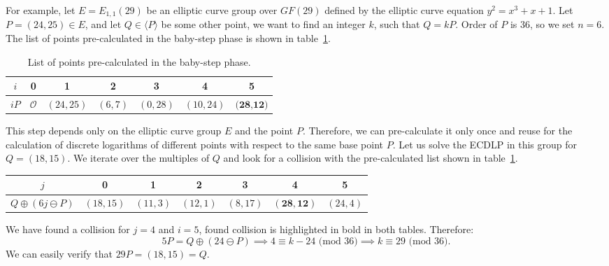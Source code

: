 \documentclass[thesis=M,english]{FITthesis}[2012/10/20]
\theoremstyle{remark}
\theoremstyle{definition}
\begin{document}
\noindent For example, let $E = E_{1,1}(29)$ be an elliptic curve group over $GF(29)$ defined by the elliptic curve equation $y^2 = x^3 + x + 1$. Let $P = (24,25) \in E$, and let $Q \in \langle P \rangle$ be some other point, we want to find an integer $k$, such that $Q = kP.$ Order of $P$ is 36, so we set $n = 6$. The list of points pre-calculated in the baby-step phase is shown in table~\ref{baby}.
\begin{table}[h]
\centering
\begin{tabular}{ |c||c|c|c|c|c|c| }
\hline
$i$ & 0 & 1 & 2 & 3 & 4 & 5\\ \hline
 $iP$ & $\mathcal{O}$ & $(24,25)$ &  $(6,7)$ & $(0,28)$ & $(10,24)$ & $\textbf{(28,12)}$ \\ \hline
\end{tabular}
\caption[List of points pre-calculated in the baby-step phase]{List of points pre-calculated in the baby-step phase.}
\label{baby}
\end{table}
This step depends only on the elliptic curve group $E$ and the point $P$. Therefore, we can pre-calculate it only once and reuse for the calculation of discrete logarithms of different points with respect to the same base point $P$. Let us solve the ECDLP in this group for $Q = (18,15)$. We iterate over the multiples of $Q$ and look for a collision with the pre-calculated list shown in table~\ref{baby}.
\begin{center}
\begin{tabular}{ |c||c|c|c|c|c|c| }
\hline
$j$ & 0 & 1 & 2 & 3 & 4 & 5\\ \hline
 $Q\oplus(6j\ominus P)$ & $(18,15)$ & $(11,3)$ &  $(12,1)$ & $(8,17)$ & $\mathbf{(28,12)}$ & $(24,4)$ \\ \hline
\end{tabular}
\end{center}
We have found a collision for $j=4$ and $i=5$, found collision is highlighted in bold in both tables. Therefore:
$$
5P = Q\oplus(24\ominus P) \implies 4 \equiv k -24 \text{ (mod 36)} \implies k \equiv 29  \text{ (mod 36)}.
$$
We can easily verify that $29P = (18,15) = Q.$
\end{document}
